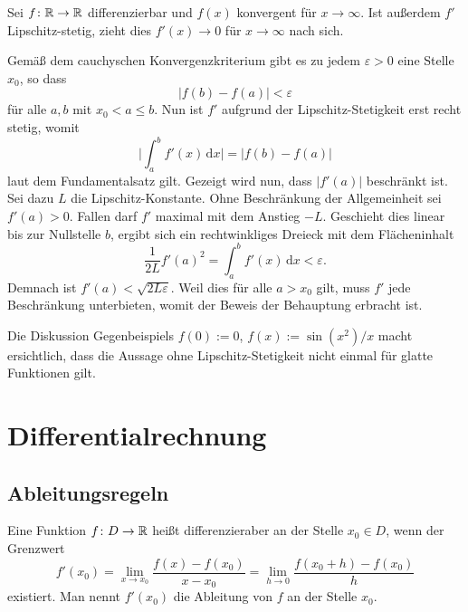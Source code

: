 \begin{Satz}
Sei $f\colon\mathbb R\to\mathbb R$ differenzierbar und $f(x)$ konvergent
für $x\to\infty$. Ist außerdem $f'$  Lipschitz-stetig,
zieht dies $f'(x)\to 0$ für $x\to\infty$ nach sich.
\end{Satz}
\begin{Beweis}
Gemäß dem cauchyschen Konvergenzkriterium gibt es zu jedem
$\varepsilon>0$ eine Stelle $x_0$, so dass
\begin{equation}
|f(b)-f(a)| < \varepsilon
\end{equation}
für alle $a,b$ mit $x_0 < a \le b$. Nun ist $f'$ aufgrund
der Lipschitz-Stetigkeit erst recht stetig, womit
\begin{equation}
\bigg|\int_a^b f'(x)\,\mathrm dx\bigg| = |f(b)-f(a)|
\end{equation}
laut dem Fundamentalsatz gilt. Gezeigt wird nun, dass $|f'(a)|$
beschränkt ist. Sei dazu $L$ die Lipschitz-Konstante. Ohne
Beschränkung der Allgemeinheit sei $f'(a)>0$. Fallen darf $f'$ maximal
mit dem Anstieg $-L$. Geschieht dies linear bis zur Nullstelle $b$,
ergibt sich ein rechtwinkliges Dreieck mit dem Flächeninhalt
\begin{equation}
\frac{1}{2L} f'(a)^2 = \int_a^b f'(x)\,\mathrm dx < \varepsilon.
\end{equation}
Demnach ist $f'(a) < \sqrt{2L\varepsilon}$. Weil dies für alle $a>x_0$
gilt, muss $f'$ jede Beschränkung unterbieten, womit
der Beweis der Behauptung erbracht ist.\;\qedsymbol
\end{Beweis}

\noindent
Die Diskussion Gegenbeispiels $f(0):=0$, $f(x):=\sin(x^2)/x$ macht
ersichtlich, dass die Aussage ohne Lipschitz-Stetigkeit nicht einmal
für glatte Funktionen gilt.

\newpage
\section{Differentialrechnung}

\subsection{Ableitungsregeln}

\begin{Definition}%
\label{diff}
Eine Funktion $f\colon D\to\mathbb R$ heißt differenzieraber an der Stelle
$x_0\in D$, wenn der Grenzwert%
\[f'(x_0) = \lim_{x\to x_0}\frac{f(x)-f(x_0)}{x-x_0}
= \lim_{h\to 0}\frac{f(x_0+h)-f(x_0)}{h}\]
existiert. Man nennt $f'(x_0)$ die Ableitung von $f$ an der Stelle
$x_0$.
\end{Definition}

